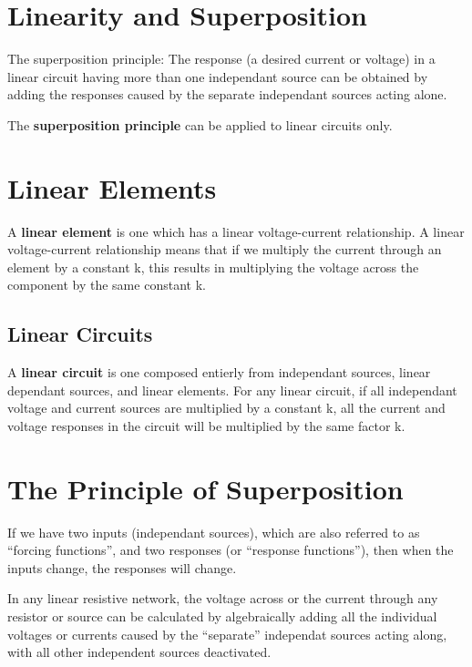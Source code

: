 \documentclass[12pt]{article}
\begin{document}
\section*{Linearity and Superposition}
\begin{theorem}
The superposition principle: The response (a desired current or voltage) in a linear circuit having more than one independant source can be obtained by adding the responses caused by the separate independant sources acting alone.
\end{theorem}

The {\bf superposition principle} can be applied to linear circuits only.

\section*{Linear Elements}
A {\bf linear element} is one which has a linear voltage-current relationship. A linear voltage-current relationship means that if we multiply the current through an element by a constant k, this results in multiplying the voltage across the component by the same constant k.

\subsection*{Linear Circuits}
A {\bf linear circuit} is one composed entierly from independant sources, linear dependant sources, and linear elements. For any linear circuit, if all independant voltage and current sources are multiplied by a constant k, all the current and voltage responses in the circuit will be multiplied by the same factor k.

\section*{The Principle of Superposition}
If we have two inputs (independant sources), which are also referred to as ``forcing functions'', and two responses (or ``response functions''), then when the inputs change, the responses will change.

\begin{theorem}
In any linear resistive network, the voltage across or the current through any resistor or source can be calculated by algebraically adding all the individual voltages or currents caused by the ``separate'' independat sources acting along, with all other independent sources deactivated.
\end{theorem}
\end{document}
